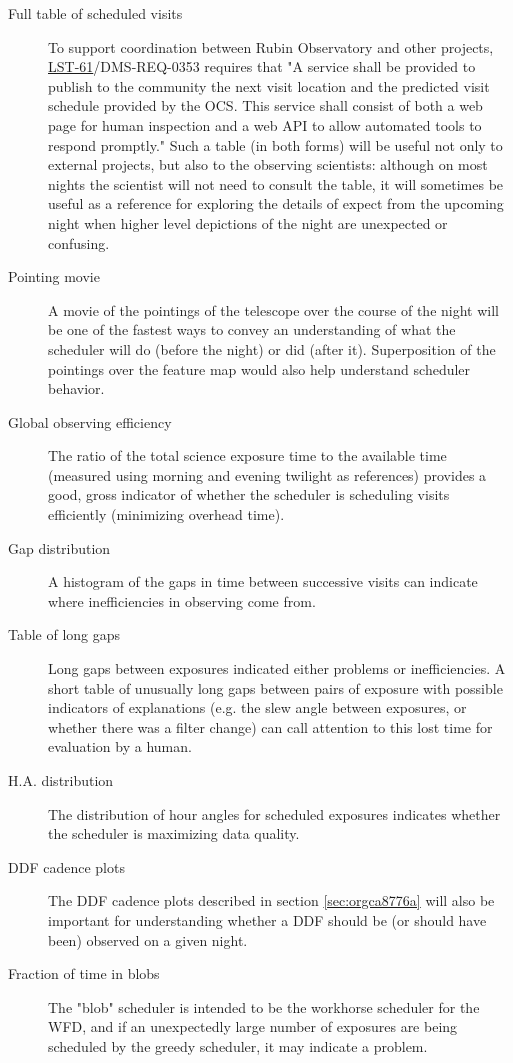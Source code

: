 \begin{description}
\item[{Full table of scheduled visits}] To support coordination between Rubin Observatory and other projects, \href{https://ls.st/lse-61}{LST-61}/DMS-REQ-0353 requires that "A service shall be provided to publish to the community the next visit location and the predicted visit schedule provided by the OCS. This service shall consist of both a web page for human inspection and a web API to allow automated tools to respond promptly." Such a table (in both forms) will be useful not only to external projects, but also to the observing scientists: although on most nights the scientist will not need to consult the table, it will sometimes be useful as a reference for exploring the details of expect from the upcoming night when higher level depictions of the night are unexpected or confusing.
\item[{Pointing movie}] A movie of the pointings of the telescope over the course of the night will be one of the fastest ways to convey an understanding of what the scheduler will do (before the night) or did (after it). Superposition of the pointings over the feature map would also help understand scheduler behavior.
\item[{Global observing efficiency}] The ratio of the total science exposure time to the available time (measured using morning and evening twilight as references) provides a good, gross indicator of whether the scheduler is scheduling visits efficiently (minimizing overhead time).
\item[{Gap distribution}] A histogram of the gaps in time between successive visits can indicate where inefficiencies in observing come from.
\item[{Table of long gaps}] Long gaps between exposures indicated either problems or inefficiencies. A short table of unusually long gaps between pairs of exposure with possible indicators of explanations (e.g. the slew angle between exposures, or whether there was a filter change) can call attention to this lost time for evaluation by a human.
\item[{H.A. distribution}] The distribution of hour angles for scheduled exposures indicates whether the scheduler is maximizing data quality.
\item[{DDF cadence plots}] The DDF cadence plots described in section \ref{sec:orgca8776a} will also be important for understanding whether a DDF should be (or should have been) observed on a given night.
\item[{Fraction of time in blobs}] The "blob" scheduler is intended to be the workhorse scheduler for the WFD, and if an unexpectedly large number of exposures are being scheduled by the greedy scheduler, it may indicate a problem.
\end{description}

